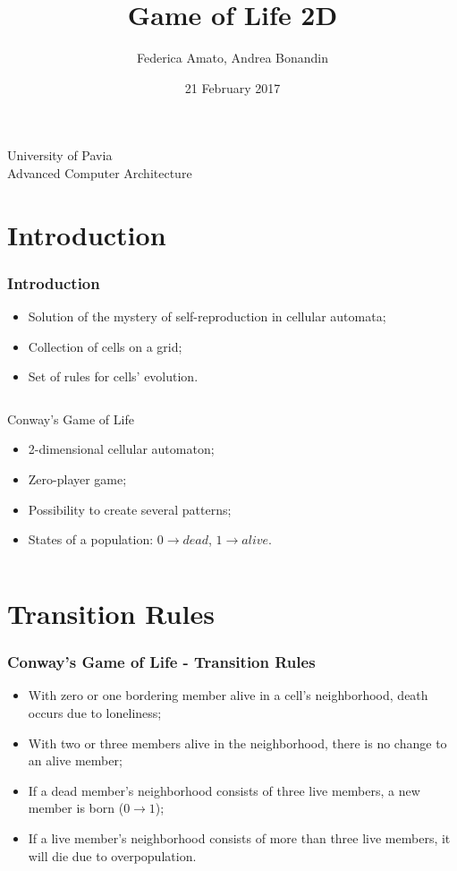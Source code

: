 \documentclass{beamer}
\begin{document}
\title{Game of Life 2D}
\author{Federica Amato, Andrea Bonandin}
\date{21 February 2017}

\begin{frame}
	\begin{center}
		\Large{University of Pavia \\
		Advanced Computer Architecture}
	\end{center}
	\titlepage
\end{frame}

\section{Introduction}
\begin{frame}
	\frametitle{Introduction}
	\begin{itemize}
		\item Solution of the mystery of self-reproduction in cellular automata;
		\item Collection of cells on a grid;
		\item Set of rules for cells' evolution.
	\end{itemize}
	\vfill
	\begin{columns}
		\begin{block}{Conway's Game of Life}
			\begin{itemize}
				\item 2-dimensional cellular automaton;
				\item Zero-player game;
				\item Possibility to create several patterns;
				\item States of a population: $0 \rightarrow dead$, $1 \rightarrow alive$.
			\end{itemize}
		\end{block}
	\end{columns}
\end{frame}

\section{Transition Rules}
\begin{frame}
	\frametitle{Conway's Game of Life - Transition Rules}
	\begin{itemize}
		\item With zero or one bordering member alive in a cell's neighborhood, death occurs due to loneliness;
		\item With two or three members alive in the neighborhood, there is no change to an alive member;
		\item If a dead member's neighborhood consists of three live members, a new member is born ($0 \rightarrow 1$);
		\item If a live member's neighborhood consists of more than three live members, it will die due to overpopulation.
	\end{itemize}
\end{frame}
\end{document}
